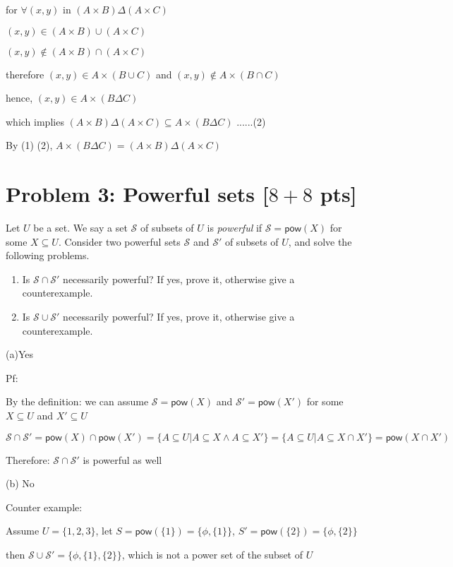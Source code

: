\documentclass[11pt,twoside]{article}
\newcommand{\problem}[1]{\section*{Problem #1}}
\begin{document}
for $\forall (x,y)$ in $(A \times B) \Delta (A \times C)$ 

$(x,y) \in (A \times B)\cup (A \times C)$

$(x,y) \notin (A \times B)\cap (A \times C)$

therefore $(x,y) \in A \times (B \cup C)$ and $(x,y) \notin A \times (B \cap C)$


hence, $(x, y) \in A \times (B \Delta C)$

which implies $(A \times B) \Delta (A \times C)\subseteq A \times (B \Delta C) $
......(2)

By (1) (2), $A \times (B \Delta C) = (A \times B) \Delta (A \times C)$


\problem{3: Powerful sets [$8+8$ pts]} 
Let $U$ be a set.
We say a set $\mathcal{S}$ of subsets of $U$ is \textit{powerful} if $\mathcal{S} = \textsf{pow}(X)$ for some $X \subseteq U$.
Consider two powerful sets $\mathcal{S}$ and $\mathcal{S}'$ of subsets of $U$, and solve the following problems.
\begin{enumerate}
    \item Is $\mathcal{S} \cap \mathcal{S}'$ necessarily powerful?
    If yes, prove it, otherwise give a counterexample.
    \item Is $\mathcal{S} \cup \mathcal{S}'$ necessarily powerful?
    If yes, prove it, otherwise give a counterexample.
\end{enumerate}


(a)Yes

Pf:

By the definition: we can assume $\mathcal{S} = \textsf{pow}(X)$ and $\mathcal{S'} = \textsf{pow}(X')$ for some $X \subseteq U$ and $X' \subseteq U$

$\mathcal{S} \cap \mathcal{S}' = \textsf{pow}(X)\cap \textsf{pow}(X') = \{A \subseteq U| A \subseteq X \land A \subseteq X'\} = \{A \subseteq U| A \subseteq X\cap X'  \} = \textsf{pow}(X\cap X') $

Therefore:  $\mathcal{S} \cap \mathcal{S}'$ is powerful as well

\hspace*{\fill}

(b) 
No

Counter example:

Assume $U = \{1,2,3\}$, let $S = \textsf{pow}(\{1\})= \{\phi, \{1\}\} $, $S' = \textsf{pow}(\{2\})= \{\phi, \{2\}\} $

then $\mathcal{S} \cup \mathcal{S}' = \{\phi, \{1\}, \{2\}\} $, which is not a power set of the subset of $U$
\end{document}
